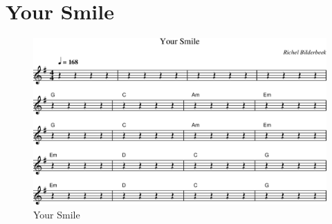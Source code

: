 \section{Your Smile}



\begin{figure}[!htbp]
  \includegraphics[width=\textwidth,height=\textheight,keepaspectratio]{../songs/xx_your_smile.png}
  \caption{Your Smile}
  \label{fig:xx_your_smile}
\end{figure}
